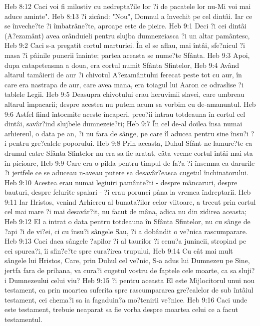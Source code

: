 Heb 8:12  Caci voi fi milostiv cu nedrepta?ile lor ?i de pacatele lor nu-Mi voi mai aduce aminte".
Heb 8:13  ?i zicând: "Nou", Domnul a învechit pe cel dintâi. Iar ce se înveche?te ?i îmbatrâne?te, aproape este de pieire.
Heb 9:1  Deci ?i cei dintâi (A?ezamânt) avea orânduieli pentru slujba dumnezeiasca ?i un altar pamântesc,
Heb 9:2  Caci s-a pregatit cortul marturiei. În el se aflau, mai întâi, sfe?nicul ?i masa ?i pâinile punerii înainte; partea aceasta se nume?te Sfânta.
Heb 9:3  Apoi, dupa catapeteasma a doua, era cortul numit Sfânta Sfintelor,
Heb 9:4  Având altarul tamâierii de aur ?i chivotul A?ezamântului ferecat peste tot cu aur, în care era nastrapa de aur, care avea mana, era toiagul lui Aaron ce odraslise ?i tablele Legii.
Heb 9:5  Deasupra chivotului erau heruvimii slavei, care umbreau altarul împacarii; despre acestea nu putem acum sa vorbim cu de-amanuntul.
Heb 9:6  Astfel fiind întocmite aceste încaperi, preo?ii intrau totdeauna în cortul cel dintâi, savâr?ind slujbele dumnezeie?ti;
Heb 9:7  În cel de-al doilea însa numai arhiereul, o data pe an, ?i nu fara de sânge, pe care îl aducea pentru sine însu?i ?i pentru gre?ealele poporului.
Heb 9:8  Prin aceasta, Duhul Sfânt ne lamure?te ca drumul catre Sfânta Sfintelor nu era sa fie aratat, câta vreme cortul întâi mai sta în picioare,
Heb 9:9  Care era o pilda pentru timpul de fa?a ?i însemna ca darurile ?i jertfele ce se aduceau n-aveau putere sa desavâr?easca cugetul închinatorului.
Heb 9:10  Acestea erau numai legiuiri pamânte?ti - despre mâncaruri, despre bauturi, despre felurite spalari - ?i erau porunci pâna la vremea îndreptarii.
Heb 9:11  Iar Hristos, venind Arhiereu al bunata?ilor celor viitoare, a trecut prin cortul cel mai mare ?i mai desavâr?it, nu facut de mâna, adica nu din zidirea aceasta;
Heb 9:12  El a intrat o data pentru totdeauna în Sfânta Sfintelor, nu cu sânge de ?api ?i de vi?ei, ci cu însu?i sângele Sau, ?i a dobândit o ve?nica rascumparare.
Heb 9:13  Caci daca sângele ?apilor ?i al taurilor ?i cenu?a junincii, stropind pe cei spurca?i, îi sfin?e?te spre cura?irea trupului,
Heb 9:14  Cu cât mai mult sângele lui Hristos, Care, prin Duhul cel ve?nic, S-a adus lui Dumnezeu pe Sine, jertfa fara de prihana, va cura?i cugetul vostru de faptele cele moarte, ca sa sluji?i Dumnezeului celui viu?
Heb 9:15  ?i pentru aceasta El este Mijlocitorul unui nou testament, ca prin moartea suferita spre rascumpararea gre?ealelor de sub întâiul testament, cei chema?i sa ia fagaduin?a mo?tenirii ve?nice.
Heb 9:16  Caci unde este testament, trebuie neaparat sa fie vorba despre moartea celui ce a facut testamentul.
